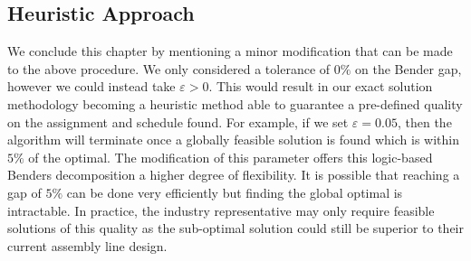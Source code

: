 \subsection{Heuristic Approach}
We conclude this chapter by mentioning a minor modification
that can be made to the above procedure.
We only considered a tolerance of $0\%$ on the Bender
gap, however we could instead take $\varepsilon>0$.
This would result in our exact solution methodology becoming
a heuristic method able to guarantee a pre-defined
quality on the assignment and schedule found.
For example, if we set $\varepsilon=0.05$, then the
algorithm will terminate once a globally feasible solution is found
which is within $5\%$ of the optimal.
The modification of this parameter 
offers this logic-based Benders decomposition
a higher degree of flexibility.
It is possible that reaching a gap of $5\%$ can be done very efficiently
but finding the global optimal is intractable.
In practice, the industry representative
may only require feasible solutions of this quality
as the sub-optimal solution could still be superior to their 
current assembly line design.


